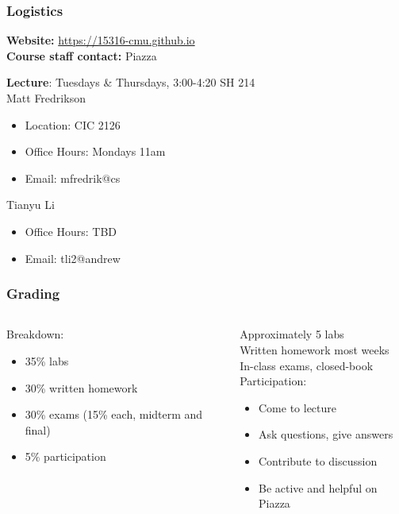 \documentclass[10pt,handout]{beamer}
\begin{document}
\begin{frame}

\frametitle{Logistics}

\textbf{Website:} \url{https://15316-cmu.github.io}
\\[1em]

\textbf{Course staff contact:} Piazza

\textbf{Lecture}: Tuesdays \& Thursdays, 3:00-4:20 SH 214
\\[1em]

Matt Fredrikson
\begin{itemize}
\item Location: CIC 2126
\item Office Hours: Mondays 11am
\item Email: mfredrik@cs
\end{itemize}

\vspace*{1em}

Tianyu Li
\begin{itemize}
\item Office Hours: TBD
\item Email: tli2@andrew
\end{itemize}

\end{frame}


\begin{frame}

\frametitle{Grading}

\begin{columns}
\begin{column}{0.45\textwidth}
Breakdown:
\begin{itemize}
\item 35\% labs
\item 30\% written homework
\item 30\% exams (15\% each, midterm and final)
\item 5\% participation
\end{itemize}
\end{column}

\begin{column}{0.55\textwidth}
Approximately 5 labs
\\[1em]

Written homework most weeks
\\[1em]

In-class exams, closed-book
\\[1em]

Participation:
\begin{itemize}
\item Come to lecture
\item Ask questions, give answers
\item Contribute to discussion
\item Be active and helpful on Piazza
\end{itemize}
\end{column}
\end{columns}

\end{frame}
\end{document}
